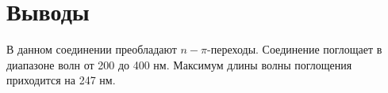 \section{Выводы}
В данном соединении преобладают $n-\pi$-переходы. Соединение поглощает в диапазоне волн от 200 до 400 нм. Максимум длины волны поглощения приходится на 247 нм.